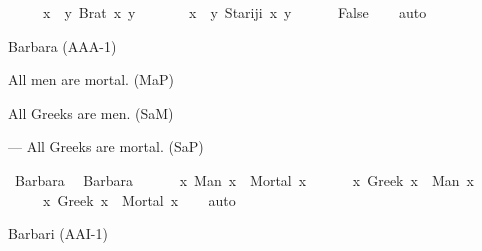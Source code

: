 \begin{isabellebody}
\begin{exercise}[subtitle=Zapisivanje logičkih formula (nastavak)]
\ \ \ \ {\isacharparenleft}{\kern0pt}{\isasymexists}\ x{\isachardot}{\kern0pt}\ {\isasymexists}\ y{\isachardot}{\kern0pt}\ Brat\ x\ y{\isacharparenright}{\kern0pt}\ {\isasymand}\isanewline
\ \ \ \ {\isacharparenleft}{\kern0pt}{\isasymnot}\ {\isacharparenleft}{\kern0pt}{\isasymexists}\ x{\isachardot}{\kern0pt}\ {\isasymexists}\ y{\isachardot}{\kern0pt}\ Stariji\ x\ y{\isacharparenright}{\kern0pt}{\isacharparenright}{\kern0pt}\ {\isasymlongrightarrow}\ \isanewline
\ \ \ \ False{\isachardoublequoteclose}\isanewline
%
\isadelimproof
\ \ %
\endisadelimproof
%
\isatagproof
{}\isamarkupfalse%
\ auto%
\endisatagproof
{\isafoldproof}%
%
\isadelimproof
%
\endisadelimproof
%
\end{exercise}
%
\begin{exercise}[subtitle=Silogizmi]
%
\begin{isamarkuptext}%
Barbara (AAA-1)%
\end{isamarkuptext}\isamarkuptrue%
%
\begin{isamarkuptext}%
All men are mortal. (MaP)%
\end{isamarkuptext}\isamarkuptrue%
%
\begin{isamarkuptext}%
All Greeks are men. (SaM)%
\end{isamarkuptext}\isamarkuptrue%
%
\begin{isamarkuptext}%
— All Greeks are mortal. (SaP)%
\end{isamarkuptext}\isamarkuptrue%
\isamarkupfalse%
\ Barbara{\isacharcolon}{\kern0pt}\ %
\isadelimproof
%
\endisadelimproof
%
\isatagproof
%
\endisatagproof
{\isafoldproof}%
%
\isadelimproof
\isanewline
%
\endisadelimproof
{}\isamarkupfalse%
\ Barbara{\isacharcolon}{\kern0pt}\ {\isachardoublequoteopen}\isanewline
\ \ \ \ {\isacharparenleft}{\kern0pt}{\isasymforall}\ x{\isachardot}{\kern0pt}\ Man\ x\ {\isasymlongrightarrow}\ Mortal\ x{\isacharparenright}{\kern0pt}\ {\isasymand}\isanewline
\ \ \ \ {\isacharparenleft}{\kern0pt}{\isasymforall}\ x{\isachardot}{\kern0pt}\ Greek\ x\ {\isasymlongrightarrow}\ Man\ x{\isacharparenright}{\kern0pt}\ {\isasymlongrightarrow}\isanewline
\ \ \ \ {\isacharparenleft}{\kern0pt}{\isasymforall}\ x{\isachardot}{\kern0pt}\ Greek\ x\ {\isasymlongrightarrow}\ Mortal\ x{\isacharparenright}{\kern0pt}{\isachardoublequoteclose}\isanewline
%
\isadelimproof
\ \ %
\endisadelimproof
%
\isatagproof
{}\isamarkupfalse%
\ auto%
\endisatagproof
{\isafoldproof}%
%
\isadelimproof
%
\endisadelimproof
%
\begin{isamarkuptext}%
Barbari (AAI-1)%

\end{isamarkuptext}
\end{exercise}
\end{isabellebody}
